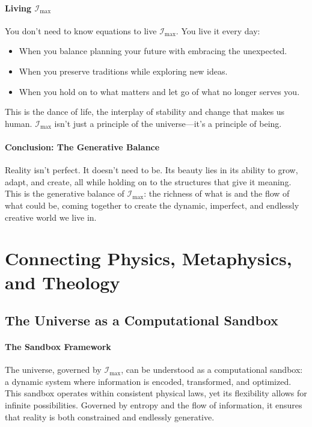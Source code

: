 \documentclass[12pt]{article}
\begin{document}
\paragraph{Living \(\mathcal{I}_{\text{max}}\)}
You don’t need to know equations to live \(\mathcal{I}_{\text{max}}\). You live it every day:
\begin{itemize}
    \item When you balance planning your future with embracing the unexpected.
    \item When you preserve traditions while exploring new ideas.
    \item When you hold on to what matters and let go of what no longer serves you.
\end{itemize}
This is the dance of life, the interplay of stability and change that makes us human. \(\mathcal{I}_{\text{max}}\) isn’t just a principle of the universe—it’s a principle of being.

\paragraph{Conclusion: The Generative Balance}
Reality isn’t perfect. It doesn’t need to be. Its beauty lies in its ability to grow, adapt, and create, all while holding on to the structures that give it meaning. This is the generative balance of \(\mathcal{I}_{\text{max}}\): the richness of what is and the flow of what could be, coming together to create the dynamic, imperfect, and endlessly creative world we live in.


\section{Connecting Physics, Metaphysics, and Theology}

\subsection{The Universe as a Computational Sandbox}

\paragraph{The Sandbox Framework}
The universe, governed by \(\mathcal{I}_{\text{max}}\), can be understood as a computational sandbox: a dynamic system where information is encoded, transformed, and optimized. This sandbox operates within consistent physical laws, yet its flexibility allows for infinite possibilities. Governed by entropy and the flow of information, it ensures that reality is both constrained and endlessly generative.
\end{document}
